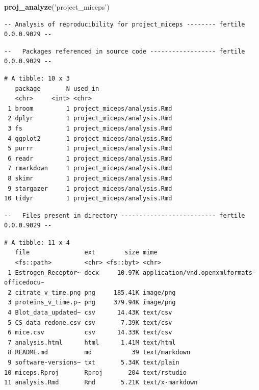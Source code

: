 \documentclass[12pt,twoside]{reedthesis}
\newenvironment{Shaded}{\begin{snugshade}}{\end{snugshade}}
\newcommand{\KeywordTok}[1]{\textcolor[rgb]{0.13,0.29,0.53}{\textbf{#1}}}
\newcommand{\StringTok}[1]{\textcolor[rgb]{0.31,0.60,0.02}{#1}}
\newcommand{\NormalTok}[1]{#1}
\begin{document}
\begin{Shaded}
\begin{Highlighting}[]
\KeywordTok{proj_analyze}\NormalTok{(}\StringTok{'project_miceps'}\NormalTok{)}
\end{Highlighting}
\end{Shaded}
\begin{verbatim}
-- Analysis of reproducibility for project_miceps -------- fertile 0.0.0.9029 --
\end{verbatim}
\begin{verbatim}
--   Packages referenced in source code ------------------ fertile 0.0.0.9029 --
\end{verbatim}
\begin{verbatim}
# A tibble: 10 x 3
   package       N used_in                    
   <chr>     <int> <chr>                      
 1 broom         1 project_miceps/analysis.Rmd
 2 dplyr         1 project_miceps/analysis.Rmd
 3 fs            1 project_miceps/analysis.Rmd
 4 ggplot2       1 project_miceps/analysis.Rmd
 5 purrr         1 project_miceps/analysis.Rmd
 6 readr         1 project_miceps/analysis.Rmd
 7 rmarkdown     1 project_miceps/analysis.Rmd
 8 skimr         1 project_miceps/analysis.Rmd
 9 stargazer     1 project_miceps/analysis.Rmd
10 tidyr         1 project_miceps/analysis.Rmd
\end{verbatim}
\begin{verbatim}
--   Files present in directory -------------------------- fertile 0.0.0.9029 --
\end{verbatim}
\begin{verbatim}
# A tibble: 11 x 4
   file               ext        size mime                                      
   <fs::path>         <chr> <fs::byt> <chr>                                     
 1 Estrogen_Receptor~ docx     10.97K application/vnd.openxmlformats-officedocu~
 2 citrate_v_time.png png     185.41K image/png                                 
 3 proteins_v_time.p~ png     379.94K image/png                                 
 4 Blot_data_updated~ csv      14.43K text/csv                                  
 5 CS_data_redone.csv csv       7.39K text/csv                                  
 6 mice.csv           csv      14.33K text/csv                                  
 7 analysis.html      html      1.41M text/html                                 
 8 README.md          md           39 text/markdown                             
 9 software-versions~ txt       5.34K text/plain                                
10 miceps.Rproj       Rproj       204 text/rstudio                              
11 analysis.Rmd       Rmd       5.21K text/x-markdown                           
\end{verbatim}
\end{document}
